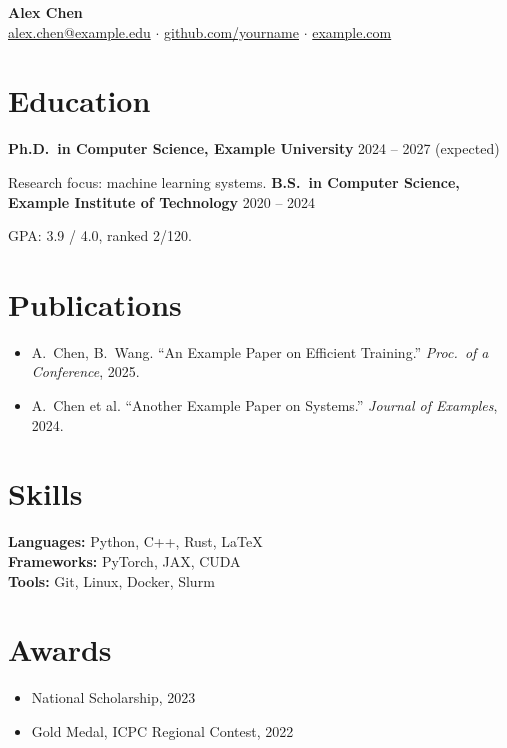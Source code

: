 \documentclass[11pt, a4paper]{article}
\newcommand{\entry}[2]{\noindent\textbf{#1} \hfill #2\par}
\begin{document}
\begin{center}
  {\LARGE\bfseries Alex Chen}\\[4pt]
  \href{mailto:alex.chen@example.edu}{alex.chen@example.edu} $\cdot$
  \href{https://github.com/yourname}{github.com/yourname} $\cdot$
  \href{https://example.com}{example.com}
\end{center}

\section{Education}
\entry{Ph.D.\ in Computer Science, Example University}{2024 -- 2027 (expected)}
Research focus: machine learning systems.
\entry{B.S.\ in Computer Science, Example Institute of Technology}{2020 -- 2024}
GPA: 3.9 / 4.0, ranked 2/120.

\section{Publications}
\begin{itemize}[leftmargin=1.2em, itemsep=1pt]
  \item A.~Chen, B.~Wang. ``An Example Paper on Efficient Training.''
        \emph{Proc.\ of a Conference}, 2025.
  \item A.~Chen et al. ``Another Example Paper on Systems.''
        \emph{Journal of Examples}, 2024.
\end{itemize}

\section{Skills}
\textbf{Languages:} Python, C++, Rust, \LaTeX \\
\textbf{Frameworks:} PyTorch, JAX, CUDA \\
\textbf{Tools:} Git, Linux, Docker, Slurm

\section{Awards}
\begin{itemize}[leftmargin=1.2em, itemsep=1pt]
  \item National Scholarship, 2023
  \item Gold Medal, ICPC Regional Contest, 2022
\end{itemize}
\end{document}
